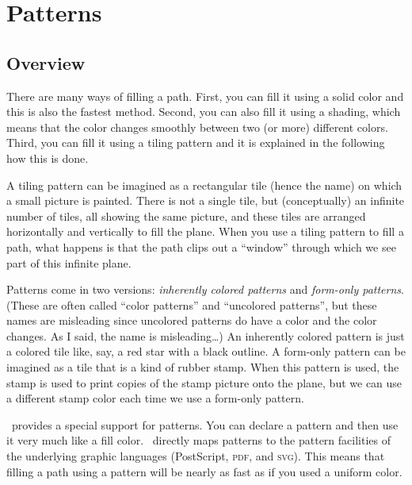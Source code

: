 %
%
%


\section{Patterns}
\label{section-patterns}

\subsection{Overview}

There are many ways of filling a path. First, you can fill it using a solid
color and this is also the fastest method. Second, you can also fill it using a
shading, which means that the color changes smoothly between two (or more)
different colors. Third, you can fill it using a tiling pattern and it is
explained in the following how this is done.
%
\begin{codeexample}
    \usetikzlibrary{patterns}
\end{codeexample}

A tiling pattern can be imagined as a rectangular tile (hence the name) on
which a small picture is painted. There is not a single tile, but
(conceptually) an infinite number of tiles, all showing the same picture, and
these tiles are arranged horizontally and vertically to fill the plane. When
you use a tiling pattern to fill a path, what happens is that the path clips
out a ``window'' through which we see part of this infinite plane.

Patterns come in two versions: \emph{inherently colored patterns} and
\emph{form-only patterns}. (These are often called ``color patterns'' and
``uncolored patterns'', but these names are misleading since uncolored patterns
do have a color and the color changes. As I said, the name is misleading\dots)
An inherently colored pattern is just a colored tile like, say, a red star with
a black outline. A form-only pattern can be imagined as a tile that is a kind
of rubber stamp. When this pattern is used, the stamp is used to print copies
of the stamp picture onto the plane, but we can use a different stamp color
each time we use a form-only pattern.

\pgfname\ provides a special support for patterns. You can declare a pattern
and then use it very much like a fill color. \pgfname\ directly maps patterns
to the pattern facilities of the underlying graphic languages (PostScript,
\textsc{pdf}, and \textsc{svg}). This means that filling a path using a pattern
will be nearly as fast as if you used a uniform color.

